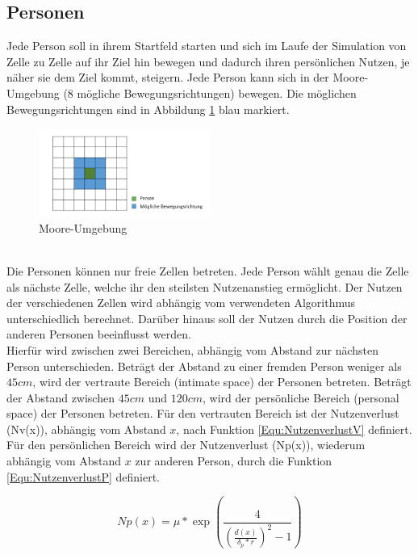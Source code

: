 \subsection{Personen}
\label{Anf:Personen}
Jede Person soll in ihrem Startfeld starten und sich im Laufe der Simulation von Zelle zu Zelle auf ihr Ziel hin bewegen und dadurch ihren persönlichen Nutzen, je näher sie dem Ziel kommt, steigern. Jede Person kann sich in der Moore-Umgebung (8 mögliche Bewegungsrichtungen) bewegen. Die möglichen Bewegungsrichtungen sind in Abbildung \ref{fig:MooreUmgebung} blau markiert.
\begin{figure}[htpb]
	\centering
	\includegraphics[width=0.5\textwidth]{abbildungen/MooreUmgebung.png}
	\caption{Moore-Umgebung}
	\label{fig:MooreUmgebung}
\end{figure}
\\
Die Personen können nur freie Zellen betreten. Jede Person wählt genau die Zelle als nächste Zelle, welche ihr den steilsten Nutzenanstieg ermöglicht. Der Nutzen der verschiedenen Zellen wird abhängig vom verwendeten Algorithmus unterschiedlich berechnet. Darüber hinaus soll der Nutzen durch die Position der anderen Personen beeinflusst werden. \\

Hierfür wird zwischen zwei Bereichen, abhängig vom Abstand zur nächsten Person unterschieden. Beträgt der Abstand zu einer fremden Person weniger als $45cm$, wird der vertraute Bereich (intimate space) der Personen betreten. Beträgt der Abstand zwischen $45cm$ und $120cm$, wird der persönliche Bereich (personal space) der Personen betreten. Für den vertrauten Bereich ist der Nutzenverlust (Nv(x)), abhängig vom Abstand $x$, nach Funktion \ref{Equ:NutzenverlustV} definiert. Für den persönlichen Bereich wird der Nutzenverlust (Np(x)), wiederum abhängig vom Abstand $x$ zur anderen Person, durch die Funktion \ref{Equ:NutzenverlustP} definiert. 

\begin{equation}
\label{Equ:NutzenverlustP}
Np(x)= \mu * \exp(\frac{4}{(\frac{d(x)}{\delta_p * r})^{2} -1}) 
\end{equation}

